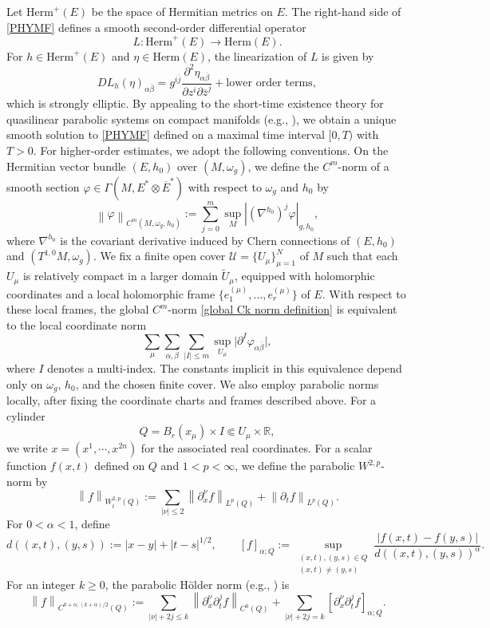 \documentclass[12pt, reqno]{amsart}
\theoremstyle{plain}
\theoremstyle{definition}
\newcommand{\p}{\partial}
\renewcommand{\bar}{\overline}
\renewcommand{\phi}{\varphi}
\newcommand{\beq}{\begin{equation}}
\newcommand{\eeq}{\end{equation}}
\newcommand{\ts}{\otimes}
\renewcommand{\>}{\rightarrow}
\newcommand{\R}{{\mathbb R}}
\renewcommand{\>}{\rightarrow}
\renewcommand{\p}{{\partial}}
\renewcommand{\bar}{\overline}
\numberwithin{equation}{section} %
\begin{document}
    Let $\mathrm{Herm}^+(E)$ be the space of Hermitian metrics on $E$.  The right-hand side of \eqref{PHYMF} defines a smooth second-order differential operator
\[
L:\mathrm{Herm}^+(E)\longrightarrow \mathrm{Herm}(E).
\]
For $h\in\mathrm{Herm}^+(E)$ and $\eta\in\mathrm{Herm}(E)$, the linearization of $L$ is given by
\beq
DL_h(\eta)_{\alpha\bar\beta}=g^{i\bar j}\frac{\p^2\eta_{\alpha\bar\beta}}{\p z^i\p\bar z^j}+\text{lower order terms},
\eeq
which is strongly elliptic.  By appealing to the short-time existence theory for quasilinear parabolic systems on compact manifolds (e.g., \cite[Chapter~XIII, Section~7]{Lie96}), we obtain a unique smooth solution to \eqref{PHYMF} defined on a maximal time interval $[0, T)$ with $T>0$.
For higher-order estimates, we adopt the following conventions.   On the Hermitian vector bundle $(E,h_0)$ over $(M,\omega_g)$,  we define the $C^m$-norm of a smooth section $\phi\in\Gamma\left(M,E^*\ts\bar E^*\right)$ with respect to $\omega_g$ and $h_0$ by
\beq
\left\|\phi\right\|_{C^m(M,\omega_g, h_0)}
:=\sum_{j=0}^{m}\sup_M\left|\left(\nabla^{h_0}\right)^j \phi\right|_{g,h_0},
\label{global Ck norm definition}
\eeq
where $\nabla^{h_0}$ is the covariant derivative induced by Chern connections of $(E,h_0)$ and $(T^{1,0}M,\omega_g)$.  We fix a finite open cover $\mathcal{U} = \{U_\mu\}_{\mu=1}^N$ of $M$ such that each $U_\mu$ is relatively compact in a larger domain $\widetilde{U}_\mu$, equipped with holomorphic coordinates and a local holomorphic frame $\{e_1^{(\mu)}, \dots, e_r^{(\mu)}\}$ of $E$.
With respect to these local frames, the global $C^m$-norm \eqref{global Ck norm definition} is equivalent to the local coordinate norm
\begin{equation}
\sum_{\mu} \sum_{\alpha,\beta} \sum_{|I| \le m}
\sup_{U_\mu} \bigl| \partial^I \phi_{\alpha\bar\beta} \bigr|,
\label{local coordinate Ck norm}
\end{equation}
where $I$ denotes a multi-index. The constants implicit in this equivalence depend only on $\omega_g$, $h_0$, and the chosen finite cover. We also employ parabolic norms locally, after fixing the coordinate charts and frames described above. For a cylinder $$Q=B_r(x_\mu)\times I\Subset U_\mu\times\R,$$ we write $x=(x^1,\cdots,x^{2n})$ for the associated real coordinates. For a scalar function $f(x,t)$ defined on $Q$ and $1<p<\infty$, we define the parabolic $W^{2,p}$-norm  by
\beq
\left\|f\right\|_{W^{2,p}_t(Q)}
:=\sum_{|\nu|\leq2}\left\|\p_x^\nu f\right\|_{L^p(Q)}
+\left\|\p_t f\right\|_{L^p(Q)}.
\label{parabolic W21p norm definition}
\eeq
For $0<\alpha<1$, define
\beq
d((x,t),(y,s)):=|x-y|+|t-s|^{1/2},
\qquad
[f]_{\alpha;Q}:=\sup_{\substack{(x,t),(y,s)\in Q\\(x,t)\neq(y,s)}}
\frac{|f(x,t)-f(y,s)|}{d((x,t),(y,s))^\alpha}.
\label{parabolic Holder seminorm definition}
\eeq
For an integer $k\geq0$, the  parabolic H\"older norm (e.g., \cite[Chapter~IV, Section~1]{Lie96}) is
\beq
\left\|f\right\|_{C^{k+\alpha,(k+\alpha)/2}(Q)}
:=\sum_{|\nu|+2j\leq k}\left\|\p_x^\nu\p_t^j f\right\|_{C^0(Q)}
+\sum_{|\nu|+2j=k}\left[\p_x^\nu\p_t^j f\right]_{\alpha;Q}.
\label{parabolic Holder norm definition}
\eeq
\end{document}
